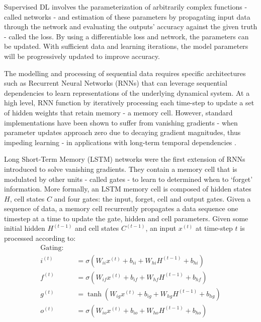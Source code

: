 \documentclass[11pt,a4paper,twoside,openright]{report}
\theoremstyle{definition}
\begin{document}
Supervised DL involves the parameterization of arbitrarily complex functions - called networks - and estimation of these parameters by propagating input data through the network and evaluating the outputs' accuracy against the given truth - called the loss. By using a differentiable loss and network, the parameters can be updated. With sufficient data and learning iterations, the model parameters will be progressively updated to improve accuracy.

The modelling and processing of sequential data requires specific architectures such as Recurrent Neural Networks (RNNs) that can leverage sequential dependencies to learn representations of the underlying dynamical system. At a high level, RNN function by iteratively processing each time-step to update a set of hidden weights that retain memory - a memory cell. However, standard implementations have been shown to suffer from vanishing gradients - when parameter updates approach zero due to decaying gradient magnitudes, thus impeding learning - in applications with long-term temporal dependencies \citep{noh_analysis_2021}.

Long Short-Term Memory (LSTM) networks \citep{hochreiter_long_1997} were the first extension of RNNs introduced to solve vanishing gradients. They contain a memory cell that is modulated by other units - called gates - to learn to determined when to `forget' information. More formally, an LSTM memory cell is composed of hidden states \(H\), cell states \(C\) and four gates: the input, forget, cell and output gates. Given a sequence of data, a memory cell recurrently propagates a data sequence one timestep at a time to update the gate, hidden and cell parameters. Given some initial hidden \(H^{(t-1)}\) and cell states \(C^{(t-1)}\), an input \(x^{(t)}\) at time-step \(t\) is processed according to:
\begin{equation}
  \begin{aligned}
  \text{Gating:} \quad & \\
    i^{(t)} &= \sigma \left( W_{ii} x^{(t)} + b_{ii} + W_{hi} H^{(t-1)} + b_{hi}  \right) \\
    f^{(t)} &= \sigma \left( W_{if} x^{(t)} + b_{if} + W_{hf} H^{(t-1)} + b_{hf}  \right) \\
    g^{(t)} &= \tanh \left( W_{ig} x^{(t)} + b_{ig} + W_{hg} H^{(t-1)} + b_{hg}  \right) \\
    o^{(t)} &= \sigma \left( W_{io} x^{(t)} + b_{io} + W_{ho} H^{(t-1)} + b_{ho}  \right)
  \end{aligned}
\label{eq:lstm1}
\end{equation}
\end{document}
